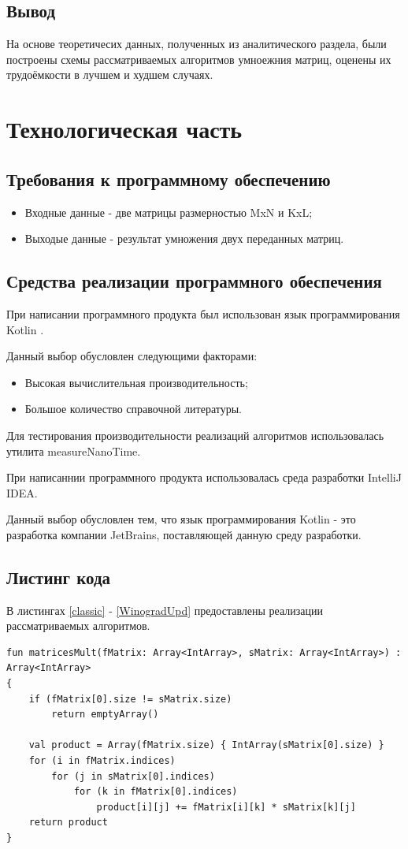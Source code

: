 \documentclass[12pt]{report}
\begin{document}
\section*{Вывод}
На основе теоретичесих данных, полученных из аналитического раздела, были построены схемы рассматриваемых алгоритмов умноежния матриц, оценены их трудоёмкости в лучшем и худшем случаях.

\chapter{Технологическая часть}
\section{Требования к программному обеспечению}
\begin{itemize}
\item Входные данные - две матрицы размерностью MxN и KxL;
\item Выходые данные - результат умножения двух переданных матриц.
\end{itemize}
\section{Средства реализации программного обеспечения}
При написании программного продукта был использован язык программирования Kotlin \cite{Kotlin}.

Данный выбор обусловлен следующими факторами:
\begin{itemize}
\item Высокая вычислительная производительность;
\item Большое количество справочной литературы.
\end{itemize}

Для тестирования производительности реализаций алгоритмов использовалась утилита measureNanoTime.

При написаннии программного продукта использовалась среда разработки IntelliJ IDEA.

Данный выбор обусловлен тем, что язык программирования Kotlin - это разработка компании JetBrains, поставляющей данную среду разработки.

\section{Листинг кода}
В листингах \ref{classic} - \ref{WinogradUpd} предоставлены реализации рассматриваемых алгоритмов.
\begin{lstlisting}[caption=Функция реализации алгоритма классического умножения матриц,
label={classic}]
fun matricesMult(fMatrix: Array<IntArray>, sMatrix: Array<IntArray>) : Array<IntArray>
{
    if (fMatrix[0].size != sMatrix.size)
        return emptyArray()

    val product = Array(fMatrix.size) { IntArray(sMatrix[0].size) }
    for (i in fMatrix.indices)
        for (j in sMatrix[0].indices)
            for (k in fMatrix[0].indices)
                product[i][j] += fMatrix[i][k] * sMatrix[k][j]
    return product
}
\end{lstlisting}
\end{document}
